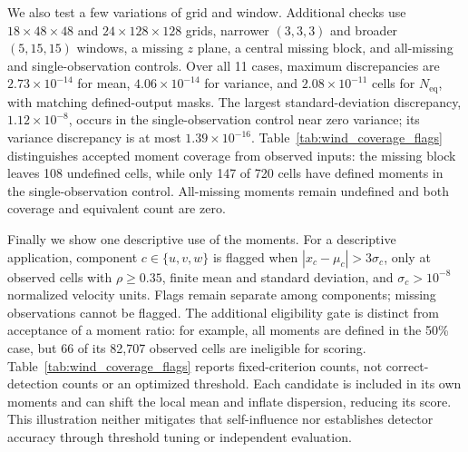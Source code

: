 \documentclass[a4paper,fleqn]{cas-sc}
\begin{document}
We also test a few variations of grid and window. Additional checks use $18\times48\times48$ and $24\times128\times128$ grids, narrower $(3,3,3)$ and broader $(5,15,15)$ windows, a missing $z$ plane, a central missing block, and all-missing and single-observation controls. Over all 11 cases, maximum discrepancies are $2.73\times10^{-14}$ for mean, $4.06\times10^{-14}$ for variance, and $2.08\times10^{-11}$ cells for $N_{\mathrm{eq}}$, with matching defined-output masks. The largest standard-deviation discrepancy, $1.12\times10^{-8}$, occurs in the single-observation control near zero variance; its variance discrepancy is at most $1.39\times10^{-16}$. Table~\ref{tab:wind_coverage_flags} distinguishes accepted moment coverage from observed inputs: the missing block leaves 108 undefined cells, while only 147 of 720 cells have defined moments in the single-observation control. All-missing moments remain undefined and both coverage and equivalent count are zero.

Finally we show one descriptive use of the moments. For a descriptive application, component $c\in\{u,v,w\}$ is flagged when $|x_c-\mu_c|>3\sigma_c$, only at observed cells with $\rho\geq0.35$, finite mean and standard deviation, and $\sigma_c>10^{-8}$ normalized velocity units. Flags remain separate among components; missing observations cannot be flagged. The additional eligibility gate is distinct from acceptance of a moment ratio: for example, all moments are defined in the 50\% case, but 66 of its 82,707 observed cells are ineligible for scoring. Table~\ref{tab:wind_coverage_flags} reports fixed-criterion counts, not correct-detection counts or an optimized threshold. Each candidate is included in its own moments and can shift the local mean and inflate dispersion, reducing its score. This illustration neither mitigates that self-influence nor establishes detector accuracy through threshold tuning or independent evaluation.
\end{document}
